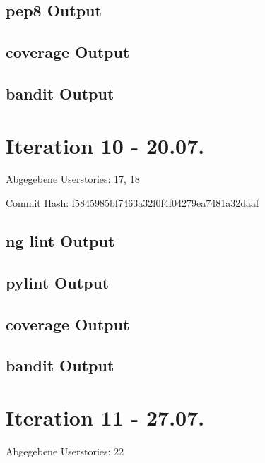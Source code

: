 \documentclass[accentcolor=tud0b,12pt,paper=a4]{tudreport}
\begin{document}
	\subsection*{pep8 Output}
	
	
	\subsection*{coverage Output}
	
	
	\subsection*{bandit Output}
	

\section*{Iteration 10 - 20.07.}
Abgegebene Userstories: 17, 18

	Commit Hash: f5845985bf7463a32f0f4f04279ea7481a32daaf
	
	\subsection*{ng lint Output}
	
	
	\subsection*{pylint Output}
	
	
	\subsection*{coverage Output}
	
	
	\subsection*{bandit Output}
	

\section*{Iteration 11 - 27.07.}
	Abgegebene Userstories: 22
	
\end{document}
